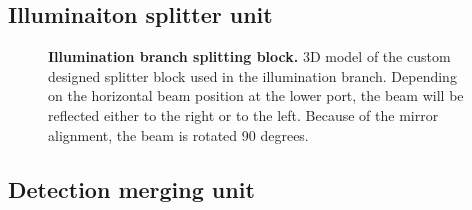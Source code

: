 \documentclass{diploma_style}
\begin{document}
\subsection{Illuminaiton splitter unit}
\label{sec:splitter}
\begin{figure}[htb]
    \centering
\caption{\textbf{Illumination branch splitting block.} 3D model of the custom designed splitter block used in the illumination branch. Depending on the horizontal beam position at the lower port, the beam will be reflected either to the right or to the left. Because of the mirror alignment, the beam is rotated 90 degrees.}
\label{fig:splitter}
\end{figure}

\subsection{Detection merging unit}
\label{sec:dualMirror}
\end{document}
